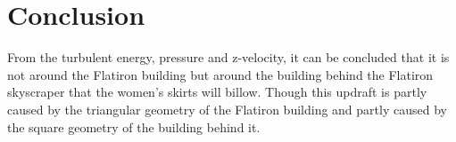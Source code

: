 \section{Conclusion}
From the turbulent energy, pressure and z-velocity, it can be concluded that it is not around the Flatiron building but around the building behind the Flatiron skyscraper that the women's skirts will billow. Though this updraft is partly caused by the triangular geometry of the Flatiron building and partly caused by the square geometry of the building behind it. 